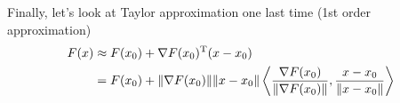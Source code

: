 Finally, let's look at Taylor approximation one last time (1st order approximation)
\begin{align*}
F(x)&\approx F(x_{0})+ \nabla F(x_{0})^{{\rm T}}(x-x_{0})\\
&=F(x_{0})+\Vert\nabla F(x_{0})\Vert \Vert x-x_{0}\Vert \left< \frac{\nabla F(x_{0})}{\Vert\nabla F(x_{0})\Vert},\frac{x-x_{0}}{\Vert x-x_{0}\Vert}\right>
\end{align*}
























 








